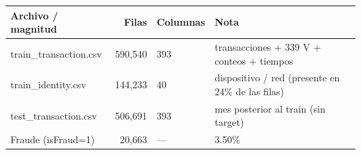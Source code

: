 \begin{tabular}{lrll}
\toprule
Archivo / magnitud & Filas & Columnas & Nota \\
\midrule
train\_transaction.csv & 590,540 & 393 & transacciones + 339 V + conteos + tiempos \\
train\_identity.csv & 144,233 & 40 & dispositivo / red (presente en 24\% de las filas) \\
test\_transaction.csv & 506{,}691 & 393 & mes posterior al train (sin target) \\
Fraude (isFraud=1) & 20,663 & --- & 3.50\% \\
\bottomrule
\end{tabular}